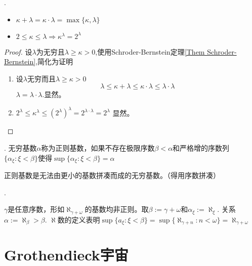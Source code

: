 \begin{Them}[基数运算的性质].
    \begin{itemize}
        \item $\kappa + \lambda = \kappa \cdot \lambda = \max\{\kappa, \lambda\}$
        \item $2\leq \kappa \leq \lambda \Rightarrow \kappa^\lambda=2^\lambda$
    \end{itemize}
    \begin{proof}
        设$\lambda$为无穷且$\lambda\geq\kappa>0$,使用Schroder-Bernstein定理\ref{Them Schroder-Bernstein},简化为证明
        \begin{enumerate}
            \item 设$\lambda$无穷而且$\lambda\geq \kappa>0$
            \[
                \lambda \leq \kappa + \lambda \leq \kappa \cdot \lambda \leq \lambda \cdot \lambda
            \]
            $\lambda=\lambda\cdot\lambda$.显然。

            \item $2^{\lambda}\leq \kappa^{\lambda}\leq (2^{\lambda})^{\lambda}=2^{\lambda\cdot\lambda}=2^{\lambda}$ 显然。
        \end{enumerate}
    \end{proof}
\end{Them}

\begin{Def}[正则基数].
    无穷基数$\alpha$称为正则基数，如果不存在极限序数$\beta <\alpha$和严格增的序数列$\{\alpha_{\xi}:\xi<\beta\}$使得$\sup{\{\alpha_{\xi}:\xi<\beta\}}=\alpha$
\end{Def}
    正则基数是无法由更小的基数拼凑而成的无穷基数。（得用序数拼凑）
\begin{Exap}[非正则基数的例子].

    $\gamma$是任意序数，形如$\aleph_{\gamma+\omega}$的基数均非正则。取$\beta:=\gamma +\omega$和$\alpha_{\xi}:=\aleph_{\xi}$. 关系$\alpha:=\aleph_{\beta}>\beta$.
    $\aleph$数的定义表明$\sup \{a_{\xi}:\xi < \beta\}=\sup \{\aleph_{\gamma + n}:n< \omega\}=\aleph_{\gamma + \omega}$
\end{Exap}

\section{Grothendieck宇宙}

